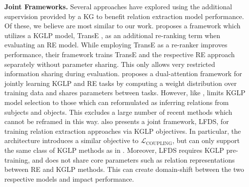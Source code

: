 \textbf{Joint Frameworks.}
Several approaches  \citep{weston-2013, han, lfds, long_tail, bag_re_kglp} have explored using the additional supervision provided by a KG to benefit relation extraction model performance. Of these, we believe \citep{weston-2013, han, lfds} are most similar to our work. \citep{weston-2013} proposes a framework which utilizes a KGLP model, TransE \citep{bordes2013translating}, as an additional re-ranking term when evaluating an RE model. While employing TransE as a re-ranker improves performance, their framework trains TransE and the respective RE approach separately without parameter sharing. This only allows very restricted information sharing during evaluation.
\citep{han} proposes a dual-attention framework for jointly learning KGLP and RE tasks by computing a weight distribution over training data and shares parameters between tasks. However, like \citep{weston-2013}, \citep{han} limits KGLP model selection to those which can reformulated as inferring relations from subjects and objects. This excludes a large number of recent methods \citep[e.g.,][]{dettmers2018conve, tucker, minerva, salesforce, coper, GAAT} which cannot be reframed in this way. \citep{lfds} also presents a joint framework, LFDS, for training relation extraction approaches via KGLP objectives. In particular, the architecture introduces a similar objective to $\mathcal{L}_{\text{COUPLING}}$, but can only support the same class of KGLP methods as in \citep{weston-2013, han}. Moreover, LFDS requires KGLP pre-training, and does not share core parameters such as relation representations between RE and KGLP methods. This can create domain-shift between the two respective models and impact performance.

